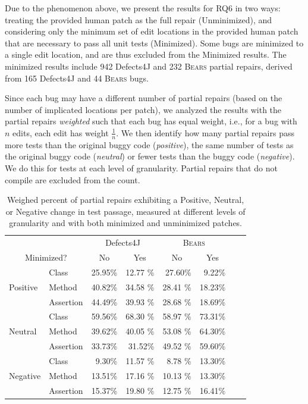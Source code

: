 \documentclass[10pt, conference]{IEEEtran}
\newcommand\bears{\textsc{Bears}\xspace}
\begin{document}
Due to the phenomenon above, we present the results for RQ6 in two ways:
treating the provided human patch as the full repair
(Unminimized), and considering only the minimum set of edit locations in the
provided human patch that are necessary
to pass all unit tests (Minimized).
Some bugs are minimized to a single edit location, and are thus excluded
from the Minimized results. The minimized results
include 942 Defects4J and 232 \bears partial repairs, derived from
165 Defects4J and 44 \bears bugs.

Since each bug may have a different 
number of partial repairs (based on the number of implicated locations per
patch), we analyzed the results with the partial repairs \emph{weighted} such that each bug
has equal weight, i.e., for a bug with $n$ edits, each edit has weight 
$\frac{1}{n}$.  We then identify how many partial repairs pass more tests
than the original buggy code (\emph{positive}), the  same number of tests as the
original buggy code (\emph{neutral}) or fewer tests than the buggy code
(\emph{negative}).  We do this for tests at each level of granularity.  Partial
repairs that do not compile are
excluded from the count. 




\begin{table}
{\begin{center}
\begin{tabular}{ll|rr|rrrr}
\toprule
\multicolumn{2}{c}{}&\multicolumn{2}{c}{Defects4J} & \multicolumn{2}{c}{\bears} \\
\multicolumn{2}{c}{Minimized?} & \multicolumn{1}{c}{No} & \multicolumn{1}{c}{Yes} & \multicolumn{1}{c}{No} & \multicolumn{1}{c}{Yes}  \\
\midrule
\multirow{3}{*}{Positive} & Class & 25.95\% & 12.77 \% & 27.60\% & 9.22\%  \\
 & Method & 40.82\% & 34.58 \% & 28.41 \% & 18.23\%  \\
 & Assertion & 44.49\% & 39.93 \% & 28.68 \% & 18.69\%  \\ 
\midrule
\multirow{3}{*}{Neutral} & Class & 59.56\% & 68.30 \% & 58.97 \% & 73.31\% \\
 & Method & 39.62\% & 40.05 \% & 53.08 \% & 64.30\%  \\
 & Assertion & 33.73\% & 31.52\% & 49.52 \% &  59.60\%  \\ 
\midrule
\multirow{3}{*}{Negative} & Class & 9.30\% & 11.57 \% & 8.78 \% & 13.30\%  \\
 & Method & 13.51\% & 17.16 \% & 10.13 \% & 13.30\%  \\
 & Assertion & 15.37\% & 19.80 \% & 12.75 \% &  16.41\%  \\ 
\bottomrule
\end{tabular}
\end{center}}
\caption{Weighed percent of partial repairs exhibiting a {\normalfont Positive}, {\normalfont Neutral},
	or {\normalfont Negative} change in test passage, measured at different levels of granularity
	and with both minimized and unminimized patches.}
\label{yiweitable}
\end{table}
\end{document}
